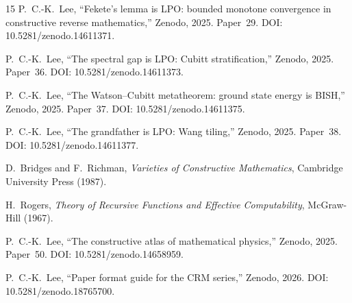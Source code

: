 \documentclass[11pt,a4paper]{article}
\theoremstyle{plain}
\theoremstyle{definition}
\begin{document}
\begin{thebibliography}{15}
P.~C.-K.~Lee,
``Fekete's lemma is LPO: bounded monotone convergence
in constructive reverse mathematics,''
Zenodo, 2025. Paper~29.
DOI: 10.5281/zenodo.14611371.

P.~C.-K.~Lee,
``The spectral gap is LPO: Cubitt stratification,''
Zenodo, 2025. Paper~36.
DOI: 10.5281/zenodo.14611373.

P.~C.-K.~Lee,
``The Watson--Cubitt metatheorem: ground state energy is BISH,''
Zenodo, 2025. Paper~37.
DOI: 10.5281/zenodo.14611375.

P.~C.-K.~Lee,
``The grandfather is LPO: Wang tiling,''
Zenodo, 2025. Paper~38.
DOI: 10.5281/zenodo.14611377.

D.~Bridges and F.~Richman,
\emph{Varieties of Constructive Mathematics},
Cambridge University Press (1987).

H.~Rogers,
\emph{Theory of Recursive Functions and Effective Computability},
McGraw-Hill (1967).

P.~C.-K.~Lee,
``The constructive atlas of mathematical physics,''
Zenodo, 2025. Paper~50.
DOI: 10.5281/zenodo.14658959.

P.~C.-K.~Lee,
``Paper format guide for the CRM series,''
Zenodo, 2026.
DOI: 10.5281/zenodo.18765700.

\end{thebibliography}
\end{document}
